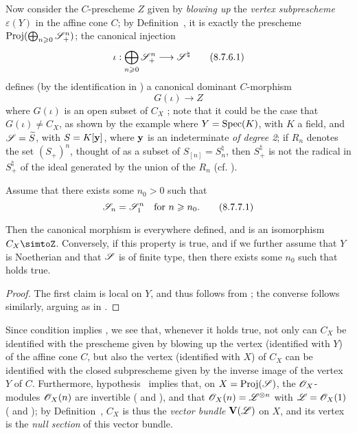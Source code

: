 \begin{env}[8.7.6]
\label{II.8.7.6}
Now consider the $C$-prescheme $Z$ given by \emph{blowing up} the \emph{vertex subprescheme $\varepsilon(Y)$} in the affine cone $C$;
by Definition~, it is exactly the prescheme $\operatorname{Proj}(\bigoplus_{n\geqslant0}\mathscr{S}_+^n)$;
the canonical injection
\[
\label{II.8.7.6.1}
  \iota: \bigoplus_{n\geq0} \sh{S}_+^n \to \sh{S}^\natural
\tag{8.7.6.1}
\]
defines (by the identification in ) a canonical dominant $C$-morphism
\[
\label{II.8.7.6.2}
  G(\iota)\to Z
  \tag{8.7.6.2}
\]
where $G(\iota)$ is an open subset of $C_X$ ;
note that it could be the case that $G(\iota)\neq C_X$, as shown by the example where $Y=\operatorname{Spec}(K)$, with $K$ a field, and $\mathscr{S}=\widetilde{S}$, with $S=K[\mathbf{y}]$, where $\mathbf{y}$ is an indeterminate \emph{of degree 2};
if $R_n$ denotes the set $(S_+)^n$, thought of as a subset of $S_{[n]}=S_n^\natural$, then $S_+^\natural$ is not the radical in $S_+^\natural$ of the ideal generated by the union of the $R_n$ (cf. ).
\end{env}

\begin{corollary}[8.7.7]
\label{II.8.7.7}
Assume that there exists some $n_0>0$ such that
\[
\label{II.8.7.7.1}
  \mathscr{S}_n=\mathscr{S}_1^n
  \quad
  \text{for }n\geqslant n_0.
  \tag{8.7.7.1}
\]

Then the canonical morphism  is everywhere defined, and is an isomorphism $C_X\simtoZ$.
Conversely, if this property is true, and if we further assume that $Y$ is Noetherian and that $\mathscr{S}$ is of finite type, then there exists some $n_0$ such that  holds true.
\end{corollary}

\begin{proof}
\label{II.8.7.7}
The first claim is local on $Y$, and thus follows from ;
the converse follows similarly, arguing as in .
\end{proof}

\begin{remark}[8.7.8]
\label{II.8.7.8}
Since condition  implies , we see that, whenever it holds true, not only can $C_X$ be identified with the prescheme given by blowing up the vertex (identified with $Y$) of the affine cone $C$, but also the vertex (identified with $X$) of $C_X$ can be identified with the closed subprescheme given by the inverse image of the vertex $Y$ of $C$.
Furthermore, hypothesis~ implies that, on $X=\operatorname{Proj}(\mathscr{S})$, the $\mathscr{O}_X$-modules $\mathscr{O}_X(n)$ are invertible ( and ), and that $\mathscr{O}_X(n)=\mathscr{L}^{\otimes n}$ with $\mathscr{L}=\mathscr{O}_X(1)$ ( and );
by Definition~, $C_X$ is thus the \emph{vector bundle} $\mathbf{V}(\mathscr{L})$ on $X$, and its vertex is the \emph{null section} of this vector bundle.
\end{remark}

